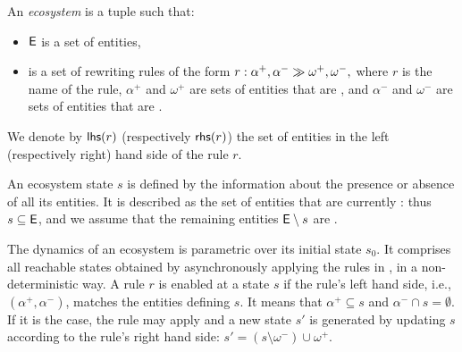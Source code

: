 \documentclass[a4paper,twoside]{article}
\begin{document}
\begin{definition}[Ecosystem]
An \emph{ecosystem} \RR is a tuple \rsys{\E}{\Ru} such that:
\begin{itemize}
\item $\mathsf{E}$ is a set of entities, 
\item \Ru is a set of rewriting rules of the form
$ r: \alpha^+,\alpha^- \gg \omega^+,\omega^-, $
where 
$r$ is the name of the rule, 
$\alpha^+$ and $\omega^+$ are sets of entities that are \On, and 
$\alpha^-$ and $\omega^-$ are sets of entities that are \Off.
\end{itemize}
\end{definition}

We denote by $\mathsf{lhs}(r)$ (respectively $\mathsf{rhs}(r)$) the set of entities in the left (respectively right) hand side of the rule $r$. 

An ecosystem state $s$ is defined by the information 
about the presence or absence of all its entities. It is described as the set of entities that are currently \On: thus 
$s \subseteq  \mathsf{E}$, and we assume  that the remaining entities $\mathsf{E} \setminus s$ are \Off.

The dynamics of an ecosystem \rsys{\E}{\Ru} is parametric over its initial state $s_0$.  
It comprises all reachable states obtained by asynchronously applying the rules in {\Ru}, in a non-deterministic way.
A rule $r$ is enabled at a state $s$ if the rule's left hand side, i.e., $(\alpha^+, \alpha^-)$,
matches the entities defining $s$. 
It means that $\alpha^+\subseteq s$ and $\alpha^- \cap s=\emptyset$.
If it is the case, the rule may apply and 
a new state $s'$ is generated by updating $s$ according to the rule's right hand side: $s'=(s\setminus \omega^-)\cup \omega^+. $
 
\end{document}
